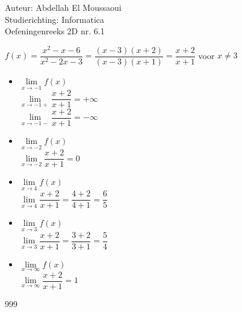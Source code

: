 \documentclass[a4paper]{article}
\begin{document}
  
\noindent \large Auteur: Abdellah El Moussaoui \\
\noindent \large Studierichting: Informatica\\
\noindent \large Oefeningenreeks 2D nr. 6.1\\

\medskip

\normalsize


$f(x)=\dfrac{x^2-x-6}{x^2-2x-3} = \dfrac{\left(x-3\right)\left(x+2\right)}{\left(x-3\right)\left(x+1\right)} = \dfrac{x+2}{x+1}$ voor $x\neq3$\\

\begin{itemize}
    \item $\lim\limits_{x\to-1} f(x)$\\

    $ \lim\limits_{x\to-1+}\dfrac{x+2}{x+1} = +\infty$\\

$ \lim\limits_{x\to-1-}\dfrac{x+2}{x+1} = -\infty$\\

    \item $\lim\limits_{x\to-2} f(x)$\\

    $ \lim\limits_{x\to-2}\dfrac{x+2}{x+1} = 0$\\

    \item $\lim\limits_{x\to4} f(x)$\\

    $ \lim\limits_{x\to4}\dfrac{x+2}{x+1} = \dfrac{4+2}{4+1}=\dfrac{6}{5}$\\

    \item $\lim\limits_{x\to3} f(x)$\\

    $ \lim\limits_{x\to3}\dfrac{x+2}{x+1} = \dfrac{3+2}{3+1}=\dfrac{5}{4}$\\

    \item $\lim\limits_{x\to \infty} f(x)$\\

    $ \lim\limits_{x\to \infty}\dfrac{x+2}{x+1} = 1$\\
\end{itemize} 




\begin{thebibliography}{999}
\end{thebibliography}
\end{document}
